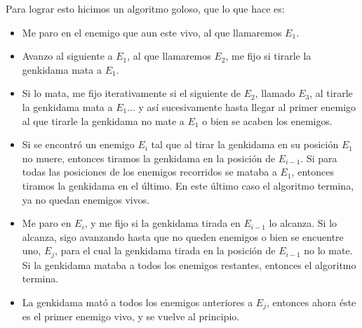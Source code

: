 Para lograr esto hicimos un algoritmo goloso, que lo que hace es:
\begin{itemize}
\item Me paro en el enemigo que aun este vivo, al que llamaremos $E_1$.
\item Avanzo al siguiente a $E_1$, al que llamaremos $E_2$, me fijo si tirarle la genkidama mata a $E_1$.
\item Si lo mata, me fijo iterativamente si el siguiente de $E_2$, llamado $E_3$, al tirarle la genkidama mata a $E_1$... y así sucesivamente hasta llegar al primer enemigo al que tirarle la genkidama no mate a $E_1$ o bien se acaben los enemigos.
\item Si se encontró un enemigo $E_i$ tal que al tirar la genkidama en su posición $E_1$ no muere, entonces tiramos la genkidama en la posición de $E_{i-1}$. Si para todas las posiciones de los enemigos recorridos se mataba a $E_1$, entonces tiramos la genkidama en el último. En este último caso el algoritmo termina, ya no quedan enemigos vivos.
\item Me paro en $E_i$, y me fijo si la genkidama tirada en $E_{i-1}$ lo alcanza. Si lo alcanza, sigo avanzando hasta que no queden enemigos o bien se encuentre uno, $E_j$, para el cual la genkidama tirada en la posición de $E_{i-1}$ no lo mate. Si la genkidama mataba a todos los enemigos restantes, entonces el algoritmo termina.
\item La genkidama mató a todos los enemigos anteriores a $E_j$, entonces ahora éste es el primer enemigo vivo, y se vuelve al principio.

\end{itemize}